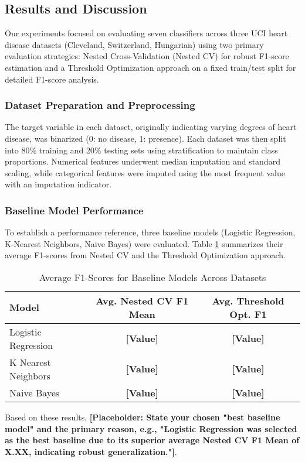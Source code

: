 \documentclass{article}
\begin{document}
\subsection{Results and Discussion}
Our experiments focused on evaluating seven classifiers across three UCI heart disease datasets (Cleveland, Switzerland, Hungarian) using two primary evaluation strategies: Nested Cross-Validation (Nested CV) for robust F1-score estimation and a Threshold Optimization approach on a fixed train/test split for detailed F1-score analysis.

\subsubsection{Dataset Preparation and Preprocessing}
The target variable in each dataset, originally indicating varying degrees of heart disease, was binarized (0: no disease, 1: presence). Each dataset was then split into 80\% training and 20\% testing sets using stratification to maintain class proportions. Numerical features underwent median imputation and standard scaling, while categorical features were imputed using the most frequent value with an imputation indicator.

\subsubsection{Baseline Model Performance}
To establish a performance reference, three baseline models (Logistic Regression, K-Nearest Neighbors, Naive Bayes) were evaluated. Table \ref{tab:baseline_perf} summarizes their average F1-scores from Nested CV and the Threshold Optimization approach.

\begin{table}[htbp]
\centering
\caption{Average F1-Scores for Baseline Models Across Datasets}
\label{tab:baseline_perf}
\begin{tabular}{lcc}
\toprule
Model                 & Avg. Nested CV F1 Mean & Avg. Threshold Opt. F1 \\
\midrule
Logistic Regression   & \textbf{[Value]} & \textbf{[Value]}    \\
K Nearest Neighbors   & \textbf{[Value]} & \textbf{[Value]}    \\
Naive Bayes           & \textbf{[Value]} & \textbf{[Value]}    \\
\bottomrule
\end{tabular}
\end{table}

Based on these results, \textbf{[Placeholder: State your chosen "best baseline model" and the primary reason, e.g., "Logistic Regression was selected as the best baseline due to its superior average Nested CV F1 Mean of X.XX, indicating robust generalization."]}.
\end{document}
